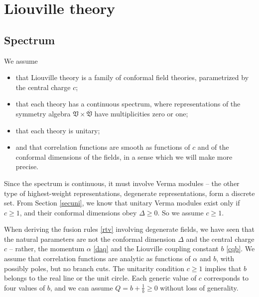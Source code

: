 \documentclass[12pt,a4paper,notitlepage]{report}
\numberwithin{equation}{section}
\theoremstyle{break}
\begin{document}
\section{Liouville theory \label{secliou}}

\subsection{Spectrum \label{secspe}}

We assume 
\begin{itemize}
 \item that Liouville theory is a family of conformal field theories, parametrized by the central charge $c$;
\item that each theory has a continuous spectrum, where representations of the symmetry algebra $\mathfrak{V}\times\overline{\mathfrak{V}}$ have multiplicities zero or one;
\item that each theory is unitary;
\item and that correlation functions are smooth as functions of $c$ and of the conformal dimensions of the fields, in a sense which we will make more precise.
\end{itemize}
Since the spectrum is continuous, it must involve Verma modules -- the other type of highest-weight representations, degenerate representations, form a discrete set. From Section \ref{secuni}, we know that unitary Verma modules exist only if $c\geq 1$, and their conformal dimensions obey $\Delta \geq 0$. So we assume $c\geq 1$. 

When deriving the fusion rules \eqref{rtv} involving degenerate fields, we have seen that the natural parameters are not the conformal dimension $\Delta$ and the central charge $c$ -- rather, the momentum $\alpha$ \eqref{daq} and the Liouville coupling constant $b$ \eqref{cqb}.
We assume that correlation functions are analytic as functions of $\alpha$ and $b$, with possibly poles, but no branch cuts. 
The unitarity condition $c\geq 1$ implies that 
$b$ belongs to the real line or the unit circle.
Each generic value of $c$ corresponds to four values of $b$, and we can assume $Q=b+\frac{1}{b}\geq 0$ without loss of generality.
\end{document}
